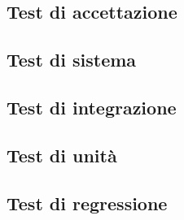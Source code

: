 \subsection{Test di accettazione}

\subsection{Test di sistema}

\subsection{Test di integrazione}

\subsection{Test di unità}

\subsection{Test di regressione}

